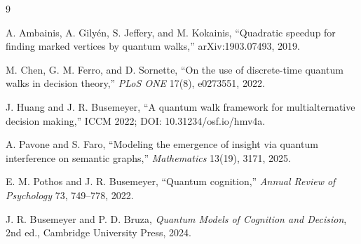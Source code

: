 \documentclass[10pt]{article}
\begin{document}
\begin{thebibliography}{9}
\small
\setlength{\itemsep}{0pt}

A. Ambainis, A. Gily\'en, S. Jeffery, and M. Kokainis,
``Quadratic speedup for finding marked vertices by quantum walks,''
arXiv:1903.07493, 2019.

M. Chen, G. M. Ferro, and D. Sornette,
``On the use of discrete-time quantum walks in decision theory,''
\emph{PLoS ONE} 17(8), e0273551, 2022.

J. Huang and J. R. Busemeyer,
``A quantum walk framework for multialternative decision making,''
ICCM 2022; DOI: 10.31234/osf.io/hmv4a.

A. Pavone and S. Faro,
``Modeling the emergence of insight via quantum interference on semantic graphs,''
\emph{Mathematics} 13(19), 3171, 2025.

E. M. Pothos and J. R. Busemeyer,
``Quantum cognition,''
\emph{Annual Review of Psychology} 73, 749--778, 2022.

J. R. Busemeyer and P. D. Bruza,
\emph{Quantum Models of Cognition and Decision}, 2nd ed.,
Cambridge University Press, 2024.

\end{thebibliography}
\end{document}
